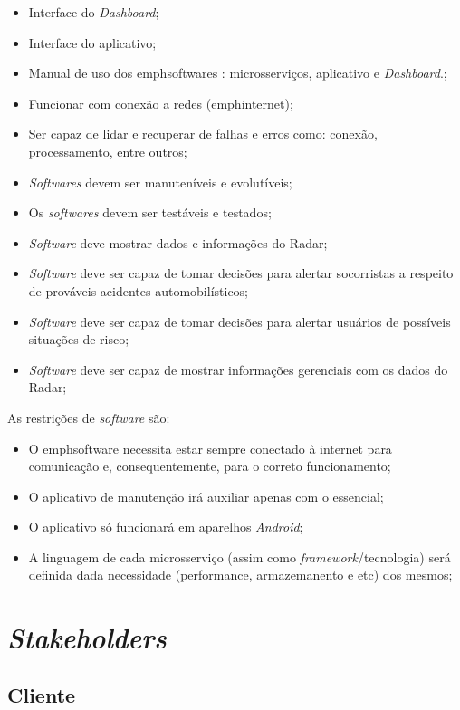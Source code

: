 \begin{itemize}
    \item Interface do \emph{Dashboard};
    \item Interface do aplicativo;
    \item Manual de uso dos emph{softwares} : microsserviços, aplicativo e \emph{Dashboard}.;
    \item Funcionar com conexão a redes (emph{internet});
    \item Ser capaz de lidar e recuperar de falhas e erros como: conexão, processamento, entre outros;
    \item \emph{Softwares} devem ser manuteníveis e evolutíveis;
    \item Os \emph{softwares} devem ser testáveis e testados;
    \item \emph{Software} deve mostrar dados e informações do Radar;
    \item \emph{Software} deve ser capaz de tomar decisões para alertar socorristas a respeito de prováveis acidentes automobilísticos;
    \item \emph{Software} deve ser capaz de tomar decisões para alertar usuários de possíveis situações de risco;
    \item \emph{Software} deve ser capaz de mostrar informações gerenciais com os dados do Radar;
\end{itemize}

As restrições de \emph{software} são:

\begin{itemize}
    \item O emph{software} necessita estar sempre conectado à internet para comunicação e, consequentemente, para o correto funcionamento;
    \item O aplicativo de manutenção irá auxiliar apenas com o essencial;
    \item O aplicativo só funcionará em aparelhos \emph{Android};
    \item A linguagem de cada microsserviço (assim como \emph{framework}/tecnologia) será definida dada necessidade (performance, armazemanento e etc) dos mesmos;
\end{itemize}

\section{\emph{Stakeholders}}

\subsection {Cliente}

